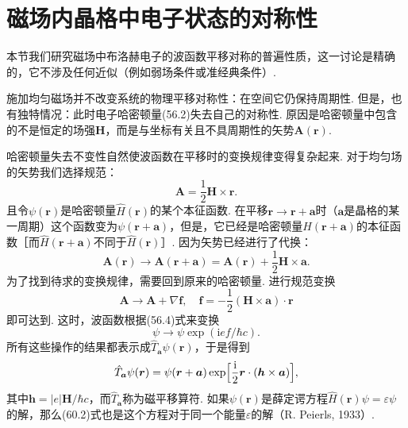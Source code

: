 \section{磁场内晶格中电子状态的对称性}

本节我们研究磁场中布洛赫电子的波函数平移对称的普遍性质，这一讨论是精确的，它不涉及任何近似（例如弱场条件或准经典条件）.

施加均匀磁场并不改变系统的物理平移对称性：在空间它仍保持周期性. 但是，也有独特情况：此时电子哈密顿量(56.2)失去自己的对称性. 原因是哈密顿量中包含的不是恒定的场强$\bm H$，而是与坐标有关且不具周期性的矢势$\bm A(\bm r)$.

哈密顿量失去不变性自然使波函数在平移时的变换规律变得复杂起来. 对于均匀场的矢势我们选择规范：
\begin{equation}
\bm A=\frac{1}{2}\bm H\times\bm r.
\label{60.1}
\end{equation}
且令$\psi(\bm r)$是哈密顿量$\hat H(\bm r)$的某个本征函数. 在平移$\bm r\to\bm r+\bm a$时（$\bm a$是晶格的某一周期）这个函数变为$\psi(\bm r+\bm a)$，但是，它已经是哈密顿量$\hat H(\bm r+\bm a)$的本征函数［而$\hat H(\bm r+\bm a)$不同于$\hat H(\bm r)$］. 因为矢势已经进行了代换：
\begin{equation*}
\bm A(\bm r)\to\bm A(\bm r+\bm a)=\bm A(\bm r)+\frac{1}{2}\bm H\times\bm a.
\end{equation*}
为了找到待求的变换规律，需要回到原来的哈密顿量. 进行规范变换
\begin{equation*}
\bm A\to\bm A+\nabla\bm f,\quad
\bm f=-\frac{1}{2}(\bm H\times\bm a)\cdot\bm r
\end{equation*}
即可达到. 这时，波函数根据(56.4)式来变换
\begin{equation*}
\psi\to\psi\exp(\mathrm i ef/\hbar c).
\end{equation*}
所有这些操作的结果都表示成$\hat T_{\bm a}\psi(\bm r)$，于是得到
\begin{equation}
\hat T_{\bm a}\psi(\bm r)=\psi(\bm r+\bm a)\exp\Bigl[\frac{\mathrm i}{2}\bm r\cdot(\bm h\times\bm a)\Bigr],
\label{60.2}
\end{equation}
其中$\bm h=|e|\bm H/\hbar c$，而$\hat T_{\bm a}$称为磁平移算符. 如果$\psi(\bm r)$是薛定谔方程$\hat H(\bm r)\psi=\varepsilon\psi$的解，那么(60.2)式也是这个方程对于同一个能量$\varepsilon$的解（R. Peierls, 1933）.

